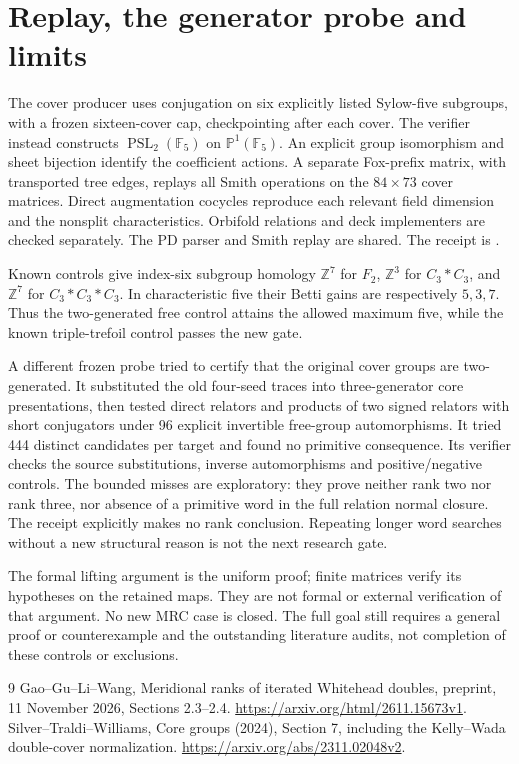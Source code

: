 \documentclass[11pt]{article}
\newcommand{\Z}{\mathbb Z}
\newcommand{\F}{\mathbb F}
\begin{document}
\section{Replay, the generator probe and limits}

The cover producer uses conjugation on six explicitly listed
Sylow-five subgroups, with a frozen sixteen-cover cap, checkpointing
after each cover. The verifier instead constructs
$\operatorname{PSL}_2(\F_5)$ on $\mathbb P^1(\F_5)$. An explicit
group isomorphism and sheet bijection identify the coefficient
actions. A separate Fox-prefix matrix, with transported tree edges,
replays all Smith operations on the $84\times73$ cover matrices.
Direct augmentation cocycles reproduce each relevant field dimension
and the nonsplit characteristics. Orbifold relations and deck
implementers are checked separately. The PD parser and Smith replay
are shared. The receipt is .

Known controls give index-six subgroup homology $\Z^7$ for $F_2$,
$\Z^3$ for $C_3*C_3$, and $\Z^7$ for $C_3*C_3*C_3$.
In characteristic five their Betti gains are respectively $5,3,7$.
Thus the two-generated free control attains the allowed maximum
five, while the known triple-trefoil control passes the new gate.

A different frozen probe tried to certify that the original cover
groups are two-generated. It substituted the old four-seed traces
into three-generator core presentations, then tested direct relators
and products of two signed relators with short conjugators under
96 explicit invertible free-group automorphisms. It tried 444
distinct candidates per target and found no primitive consequence.
Its verifier checks the source substitutions, inverse automorphisms
and positive/negative controls. The bounded misses are exploratory:
they prove neither rank two nor rank three, nor absence of a
primitive word in the full relation normal closure. The receipt
 explicitly makes no
rank conclusion. Repeating longer word searches without a new
structural reason is not the next research gate.

The formal lifting argument is the uniform proof; finite matrices
verify its hypotheses on the retained maps. They are not formal or
external verification of that argument. No new MRC case is closed.
The full goal still requires a general proof or counterexample and
the outstanding literature audits, not completion of these controls
or exclusions.

\clearpage
\begin{thebibliography}{9}
 Gao--Gu--Li--Wang, Meridional ranks of iterated
Whitehead doubles, preprint, 11 November 2026, Sections 2.3--2.4.
\url{https://arxiv.org/html/2611.15673v1}.
 Silver--Traldi--Williams, Core groups (2024),
Section 7, including the Kelly--Wada double-cover normalization.
\url{https://arxiv.org/abs/2311.02048v2}.
\end{thebibliography}
\end{document}
